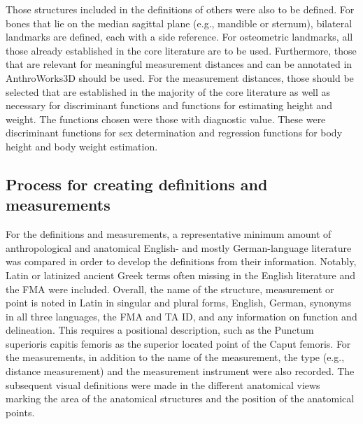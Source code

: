 \documentclass[sw]{iosart2x}
\newcommand{\aw}{AnthroWorks3D}
\begin{document}
Those structures included in the definitions of others were also to be defined.
For bones that lie on the median sagittal plane (e.g., mandible or sternum), bilateral landmarks are defined, each with a side reference.
For osteometric landmarks, all those already established in the core literature are to be used.
Furthermore, those that are relevant for meaningful measurement distances and can be annotated in \aw{} should be used.
For the measurement distances, those should be selected that are established in the majority of the core literature as well as necessary for discriminant functions and functions for estimating height and weight.
The functions chosen were those with diagnostic value.
These were discriminant functions for sex determination and regression functions for body height and body weight estimation.

\subsection{Process for creating definitions and measurements}
For the definitions and measurements, a representative minimum amount of anthropological and anatomical English- and mostly German-language literature was compared in order to develop the definitions from their information.
Notably, Latin or latinized ancient Greek terms often missing in the English literature and the FMA were included.
Overall, the name of the structure, measurement or point is noted in Latin in singular and plural forms, English, German, synonyms in all three languages, the FMA and TA ID, and any information on function and delineation.
This requires a positional description, such as the Punctum superioris capitis femoris as the superior located point of the Caput femoris.
For the measurements, in addition to the name of the measurement, the type (e.g., distance measurement) and the measurement instrument were also recorded.
The subsequent visual definitions were made in the different anatomical views marking the area of the anatomical structures and the position of the anatomical points.
\end{document}
